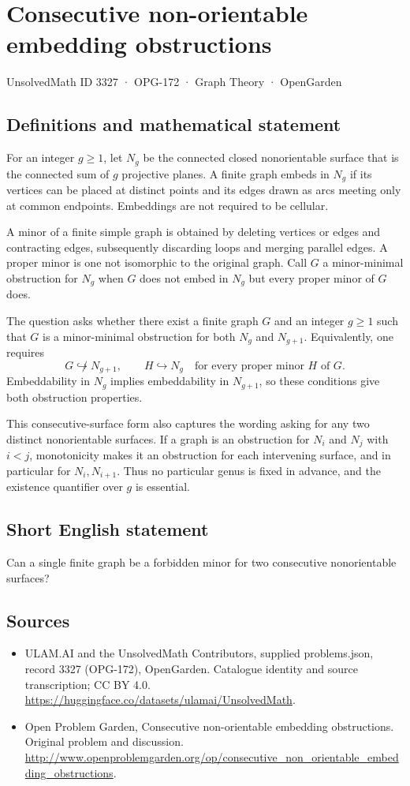 \documentclass[11pt,a4paper]{article}
\begin{document}
\section*{Consecutive non-orientable embedding obstructions}\label{3327}
{\small UnsolvedMath ID 3327 · OPG-172 · Graph Theory · OpenGarden}
\subsection{Definitions and mathematical statement}
For an integer $g\ge1$, let $N_g$ be the connected closed nonorientable surface that is the connected sum of $g$ projective planes. A finite graph embeds in $N_g$ if its vertices can be placed at distinct points and its edges drawn as arcs meeting only at common endpoints. Embeddings are not required to be cellular.

A minor of a finite simple graph is obtained by deleting vertices or edges and contracting edges, subsequently discarding loops and merging parallel edges. A proper minor is one not isomorphic to the original graph. Call $G$ a minor-minimal obstruction for $N_g$ when $G$ does not embed in $N_g$ but every proper minor of $G$ does.

The question asks whether there exist a finite graph $G$ and an integer $g\ge1$ such that $G$ is a minor-minimal obstruction for both $N_g$ and $N_{g+1}$. Equivalently, one requires
\[
 G\not\hookrightarrow N_{g+1},\qquad
 H\hookrightarrow N_g\quad\text{for every proper minor }H\text{ of }G.
\]
Embeddability in $N_g$ implies embeddability in $N_{g+1}$, so these conditions give both obstruction properties.

This consecutive-surface form also captures the wording asking for any two distinct nonorientable surfaces. If a graph is an obstruction for $N_i$ and $N_j$ with $i<j$, monotonicity makes it an obstruction for each intervening surface, and in particular for $N_i,N_{i+1}$. Thus no particular genus is fixed in advance, and the existence quantifier over $g$ is essential.
\subsection{Short English statement}
Can a single finite graph be a forbidden minor for two consecutive nonorientable surfaces?
\subsection{Sources}
\begin{itemize}
\item[S1] ULAM.AI and the UnsolvedMath Contributors, supplied problems.json, record 3327 (OPG-172), OpenGarden. Catalogue identity and source transcription; CC BY 4.0.
\url{https://huggingface.co/datasets/ulamai/UnsolvedMath}.
\item[S2] Open Problem Garden, Consecutive non-orientable embedding obstructions. Original problem and discussion.
\url{http://www.openproblemgarden.org/op/consecutive_non_orientable_embedding_obstructions}.
\end{itemize}
\end{document}
